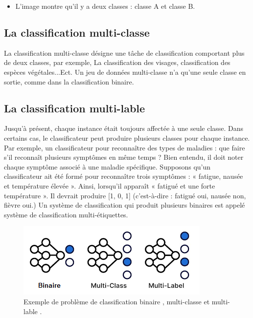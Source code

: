 \begin{itemize}
\item L’image montre qu’il y a deux classes : classe A et classe B.
\end{itemize}
\begin{center}
\end{center}


\subsection{La classification multi-classe }
La classification multi-classe désigne une tâche de classification comportant plus de deux classes, par exemple, La classification des visages, classification des espèces végétales...Ect.
 Un jeu de données multi-classe n’a qu’une seule classe en sortie, comme dans la classification binaire.
 \newpage

\subsection{La classification multi-lable }
Jusqu'à présent, chaque instance était toujours affectée à une seule classe. Dans certains cas, le classificateur peut produire plusieurs classes pour chaque instance.
   Par exemple, un classificateur pour reconnaître des types de maladies : que faire s'il reconnaît plusieurs symptômes en même temps ? Bien entendu, il doit noter chaque symptôme associé à une maladie spécifique. Supposons qu'un classificateur ait été formé pour reconnaître trois symptômes : « fatigue, nausée et température élevée ».
Ainsi, lorsqu’il apparaît « fatigué et une forte température ».
Il devrait produire [1, 0, 1] (c'est-à-dire : fatigué oui, nausée non, fièvre oui.) Un système de classification qui produit plusieurs binaires est appelé système de classification multi-étiquettes.

\begin{figure}[!h]
\centering
\includegraphics[scale=1]{Images/Chapiter2/La classification multi-lable.png}
\caption{Exemple de problème de classification binaire , multi-classe et multi-lable .}
\label{fig:03}
\end{figure}

